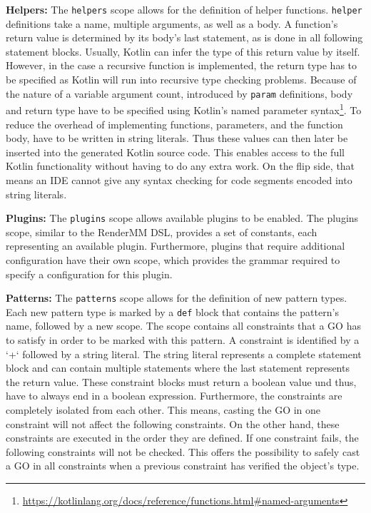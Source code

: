 \textbf{Helpers:} The \texttt{helpers} scope allows for the definition of helper functions. \texttt{helper} definitions take a name, multiple arguments, as well as a body. A function's return value is determined by its body's last statement, as is done in all following statement blocks. Usually, Kotlin can infer the type of this return value by itself. However, in the case a recursive function is implemented, the return type has to be specified as Kotlin will run into recursive type checking problems. Because of the nature of a variable argument count, introduced by \texttt{param} definitions, body and return type have to be specified using Kotlin's named parameter syntax\footnote{\url{https://kotlinlang.org/docs/reference/functions.html\#named-arguments}}. To reduce the overhead of implementing functions, parameters, and the function body, have to be written in string literals. Thus these values can then later be inserted into the generated Kotlin source code. This enables access to the full Kotlin functionality without having to do any extra work. On the flip side, that means an IDE cannot give any syntax checking for code segments encoded into string literals.

\textbf{Plugins:} The \texttt{plugins} scope allows available plugins to be enabled. The plugins scope, similar to the RenderMM DSL, provides a set of constants, each representing an available plugin. Furthermore, plugins that require additional configuration have their own scope, which provides the grammar required to specify a configuration for this plugin.

\textbf{Patterns:} The \texttt{patterns} scope allows for the definition of new pattern types. Each new pattern type is marked by a \texttt{def} block that contains the pattern's name, followed by a new scope. The scope contains all constraints that a GO has to satisfy in order to be marked with this pattern. A constraint is identified by a `+` followed by a string literal. The string literal represents a complete statement block and can contain multiple statements where the last statement represents the return value. These constraint blocks must return a boolean value und thus, have to always end in a boolean expression. Furthermore, the constraints are completely isolated from each other. This means, casting the GO in one constraint will not affect the following constraints. On the other hand, these constraints are executed in the order they are defined. If one constraint fails, the following constraints will not be checked. This offers the possibility to safely cast a GO in all constraints when a previous constraint has verified the object's type.

